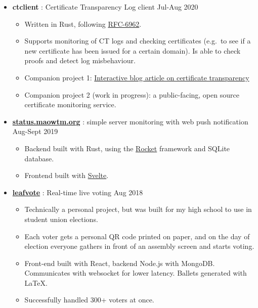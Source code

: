   \begin{itemize}

    \item \textbf{ctclient} : Certificate Transparency Log client \dashdiv{} Jul-Aug 2020

    \begin{itemize}
      \item Written in Rust, following \href{https://tools.ietf.org/html/rfc6962}{\color{link}RFC-6962}.
      \item Supports monitoring of CT logs and checking certificates (e.g.\ to see if a new certificate has been issued for a certain domain). Is able to check proofs and detect log misbehaviour.
      \item Companion project 1: \href{https://blog.maowtm.org/ct/en.html}{\color{link}Interactive blog article on certificate transparency}
      \item Companion project 2 (work in progress): a public-facing, open source certificate monitoring service.
    \end{itemize}

    \item \href{https://status.maowtm.org}{\color{link}\textbf{status.maowtm.org}} : simple server monitoring with web push notification \dashdiv{} Aug-Sept 2019

    \begin{itemize}
      \item Backend built with Rust, using the \href{https://rocket.rs}{\color{link}Rocket} framework and SQLite database.
      \item Frontend built with \href{https://svelte.dev/}{\color{link}Svelte}.
    \end{itemize}

    \item \href{https://leafvote.mww.moe}{\color{link}\textbf{leafvote}} : Real-time live voting \dashdiv{} Aug 2018

    \begin{itemize}
      \item Technically a personal project, but was built for my high school to use in student union elections.
      \item Each voter gets a personal QR code printed on paper, and on the day of election everyone gathers in front of an assembly screen and starts voting.
      \item Front-end built with React, backend Node.js with MongoDB. Communicates with websocket for lower latency. Ballets generated with \LaTeX.
      \item Successfully handled 300+ voters at once.
    \end{itemize}


\end{itemize}
